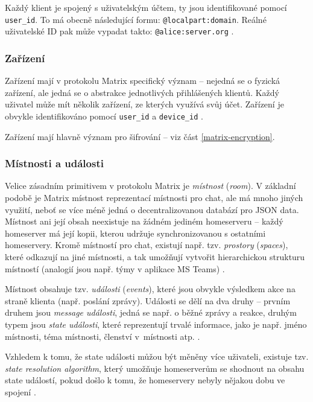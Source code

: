 Každý klient je spojený s uživatelským účtem, ty jsou identifikované pomocí
\texttt{user_id}. To má obecně následující formu:
\texttt{@localpart:domain}. Reálné uživatelské ID pak může vypadat
takto: \texttt{@alice:server.org} \parencite{MatrixORG-Spec}.

\subsubsection{Zařízení}

Zařízení mají v protokolu Matrix specifický význam -- nejedná se o fyzická
zařízení, ale jedná se o abstrakce jednotlivých přihlášených klientů. Každý
uživatel může mít několik zařízení, ze kterých využívá svůj účet. Zařízení je
obvykle identifikováno pomocí \texttt{user_id} a
\texttt{device_id} \parencite{MatrixORG-Spec}.

Zařízení mají hlavně význam pro šifrování -- viz část \ref{matrix-encryption}.

\subsubsection{Místnosti a události}

Velice zásadním primitivem v protokolu Matrix je \textit{místnost}
(\textit{room}). V základní podobě je Matrix místnost reprezentací místnosti pro
chat, ale má mnoho jiných využití, neboť se více méně jedná o decentralizovanou
databází pro JSON data. Místnost ani její obsah neexistuje na žádném jediném
homeserveru -- každý homeserver má její kopii, kterou udržuje synchronizovanou s
ostatními homeservery. Kromě místností pro chat, existují např. tzv.
\textit{prostory} (\textit{spaces}), které odkazují na jiné místnosti, a tak
umožňují vytvořit hierarchickou strukturu místností (analogií jsou např. týmy v
aplikace MS Teams) \parencite{MatrixORG-Spec}.

Místnost obsahuje tzv. \textit{události} (\textit{events}), které jsou obvykle
výsledkem akce na straně klienta (např. poslání zprávy). Události se dělí na dva
druhy -- prvním druhem jsou \textit{message události}, jedná se např. o běžné
zprávy a reakce, druhým typem jsou \textit{state události}, které reprezentují
trvalé informace, jako je např. jméno místnosti, téma místnosti, členství
v~místnosti atp. \parencite{MatrixORG-Spec}.

Vzhledem k tomu, že state události můžou být měněny více uživateli, existuje
tzv. \textit{state resolution algorithm}, který umožňuje homeserverům se
shodnout na obsahu state událostí, pokud došlo k tomu, že homeservery nebyly
nějakou dobu ve spojení \parencite{MatrixORG-Spec}.


